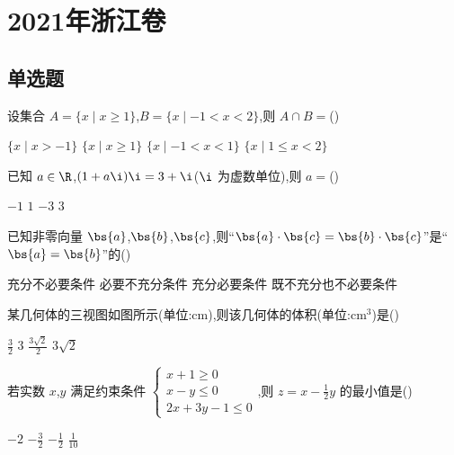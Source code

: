 
\chapter{2021年浙江卷}

\section{单选题}

\begin{problem}
设集合
\(A=\{x\mid x\ge 1\}\),\(B=\{x\mid -1<x<2\}\),则
\(A\cap B=\)(\quad)

\choices
    {\(\{x\mid x>-1\}\)}
    {\(\{x\mid x\ge 1\}\)}
    {\(\{x\mid -1<x<1\}\)}
    {\(\{x\mid 1\le x<2\}\)}
\end{problem}

\begin{problem}
已知 \(a\in\R\),\((1+a\i)\i=3+\i\)(\(\i\) 为虚数单位),则
\(a=\)(\quad)

\choices
    {\(-1\)}
    {\(1\)}
    {\(-3\)}
    {\(3\)}
\end{problem}

\begin{problem}
已知非零向量 \(\bs{a}\),\(\bs{b}\),\(\bs{c}\),则``\(\bs{a}\cdot\bs{c}=\bs{b}\cdot\bs{c}\)''是``\(\bs{a}=\bs{b}\)''的(\quad)

\choices
    {充分不必要条件}
    {必要不充分条件}
    {充分必要条件}
    {既不充分也不必要条件}
\end{problem}

\begin{problem}
某几何体的三视图如图所示(单位:\(\mathrm{cm}\)),则该几何体的体积(单位:\(\mathrm{cm}^3\))是(\quad)


\choices
    {\(\frac{3}{2}\)}
    {\(3\)}
    {\(\frac{3\sqrt{2}}{2}\)}
    {\(3\sqrt{2}\)}
\end{problem}

\begin{problem}
若实数 \(x\),\(y\) 满足约束条件 \(\begin{cases}
x+1\ge 0\\
x-y\le 0\\
2x+3y-1\le 0
\end{cases}\),则 \(z=x-\frac{1}{2}y\) 的最小值是(\quad)

\choices
    {\(-2\)}
    {\(-\frac{3}{2}\)}
    {\(-\frac{1}{2}\)}
    {\(\frac{1}{10}\)}
\end{problem}

